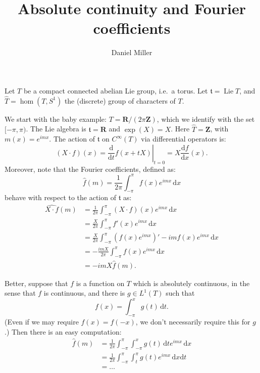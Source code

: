 \documentclass{article}
\title{Absolute continuity and Fourier coefficients}
\author{Daniel Miller}
\DeclareMathOperator{\Lie}{Lie}
\newcommand{\bR}{\mathbf{R}}
\newcommand{\bZ}{\mathbf{Z}}
\newcommand{\dd}{\mathrm{d}}
\newcommand{\ft}{\mathfrak{t}}
\begin{document}
\maketitle





Let $T$ be a compact connected abelian Lie group, i.e.~a torus. Let 
$\ft=\Lie T$, and $\widehat T=\hom(T,S^1)$ the (discrete) group of characters 
of $T$. 

We start with the baby example: $T=\bR/(2\pi \bZ)$, which we identify with the 
set $[-\pi,\pi)$. The Lie algebra is $\ft=\bR$ and $\exp(X) = X$. Here 
$\widehat T=\bZ$, with $m(x) = e^{i m x}$. The action of $\ft$ on $C^\infty(T)$ 
via differential operators is:
\[
	(X\cdot f)(x) 
		= \left.\frac{\dd}{\dd t} f(x+t X)\right|_{t=0} 
		= X \frac{\dd f}{\dd x}(x) .
\]
Moreover, note that the Fourier coefficients, defined as:
\[
	\widehat f(m) = \frac{1}{2\pi} \int_{-\pi}^\pi f(x) e^{i m x}\, \dd x
\]
behave with respect to the action of $\ft$ as:
\begin{align*}
	\widehat{X\cdot f}(m) 
		&= \frac{1}{2\pi}\int_{-\pi}^\pi (X\cdot f)(x) e^{i m x}\, \dd x \\
		&= \frac{X}{2\pi} \int_{-\pi}^\pi f'(x) e^{i m x}\, \dd x \\
		&= \frac{X}{2\pi} \int_{-\pi}^\pi (f(x) e^{i m x})' - i m f(x) e^{i m x}\, \dd x \\
		&= -\frac{i m X}{2\pi} \int_{-\pi}^\pi f(x) e^{i m x} \, \dd x \\
		&= -i m X \widehat f(m) .
\end{align*}

Better, suppose that $f$ is a function on $T$ which is absolutely continuous, 
in the sense that $f$ is continuous, and there is $g\in L^1(T)$ such that 
\[
	f(x) = \int_{-\pi}^x g(t)\, \dd t .
\]
(Even if we may require $f(x) = f(-x)$, we don't necessarily require this for 
$g$.) Then there is an easy computation:
\begin{align*}
	\widehat f(m) 
		&= \frac{1}{2\pi} \int_{-\pi}^\pi \int_{-\pi}^x g(t)\, \dd t e^{i m x}\, \dd x \\
		&= \frac{1}{2\pi} \int_{-\pi}^\pi \int_t^\pi g(t) e^{i m x}\, \dd x \dd t \\
		&= \ldots 
\end{align*}
\end{document}
